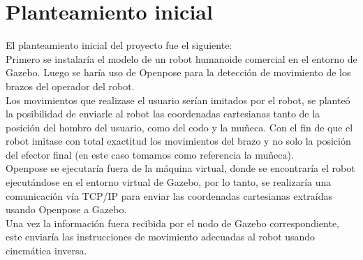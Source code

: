 \section{Planteamiento inicial}
El planteamiento inicial del proyecto fue el siguiente:\\
Primero se instalaría el modelo de un robot humanoide comercial en el entorno de Gazebo.
Luego se haría uso de Openpose para la detección de movimiento de los brazos del operador del robot.\\
Los movimientos que realizase el usuario serían imitados por el robot, se planteó la posibilidad de enviarle al robot las coordenadas cartesianas tanto de la posición del hombro del usuario, como del codo y la muñeca. Con el fin de que el robot imitase con total exactitud los movimientos del brazo y no solo la posición del efector final (en este caso tomamos como referencia la muñeca).\\
Openpose se ejecutaría fuera de la máquina virtual, donde se encontraría el robot ejecutándose en el entorno virtual de Gazebo, por lo tanto, se realizaría una comunicación vía TCP/IP para enviar las coordenadas cartesianas extraídas usando Openpose a Gazebo.\\
Una vez la información fuera recibida por el nodo de Gazebo correspondiente, este enviaría las instrucciones de movimiento adecuadas al robot usando cinemática inversa.\\
